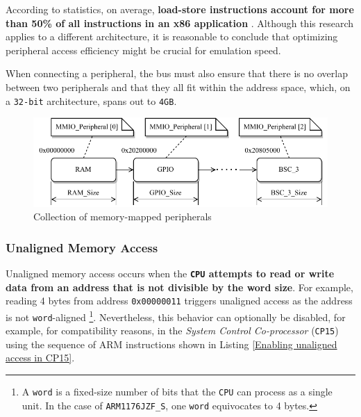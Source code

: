 \documentclass[english, ing, kiv, he, iso690numb, pdf]{fasthesis}
\begin{document}
	According to statistics, on average, \textbf{load-store instructions account for more than 50\% of all instructions in an x86 application} \cite{x86}. Although this research applies to a different architecture, it is reasonable to conclude that optimizing peripheral access efficiency might be crucial for emulation speed.
	
	When connecting a peripheral, the bus must also ensure that there is no overlap between two peripherals and that they all fit within the address space, which, on a \texttt{32-bit} architecture, spans out to \texttt{4GB}.
	
	\begin{figure}[ht]
		\centering
		\includegraphics[width=.9\textwidth]{img/diagrams/bus_peripherals.pdf}
		\caption{Collection of memory-mapped peripherals}
		\label{Collection of memory-mapped peripherals}
	\end{figure}
	
	\subsubsection{Unaligned Memory Access}
	
	Unaligned memory access occurs when the \textbf{\texttt{CPU} attempts to read or write data from an address that is not divisible by the word size}. For example, reading 4 bytes from address \texttt{0x00000011} triggers unaligned access as the address is not \texttt{word}-aligned \footnote{A \texttt{word} is a fixed-size number of bits that the \texttt{CPU} can process as a single unit. In the case of \texttt{ARM1176JZF\_S}, one \texttt{word} equivocates to 4 bytes.}. Nevertheless, this behavior can optionally be disabled, for example, for compatibility reasons, in the \textit{System Control Co-processor} (\texttt{CP15}) using the sequence of ARM instructions shown in Listing \ref{Enabling unaligned access in CP15}.
	
	
\end{document}
